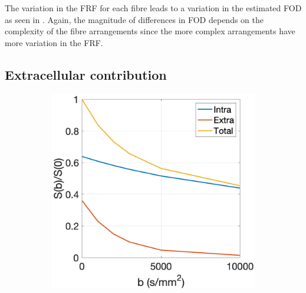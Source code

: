 The variation in the \ac{FRF} for each fibre leads to a variation in the estimated \ac{FOD} as seen in .
Again, the magnitude of differences in \ac{FOD} depends on the complexity of the fibre arrangements since the more complex arrangements have more variation in the \ac{FRF}. 

\subsection{Extracellular contribution}
\label{sec:frf_res_extracellular}


\begin{figure}
  \centering
  \begin{subfigure}[]{0.4\textwidth}
    \includegraphics[width=\textwidth]{figures/frf_experiment/in_ex_tot_Kappa_2.png}
    \caption{}
  \end{subfigure}
  ~
  \begin{subfigure}[]{0.4\textwidth}

\end{subfigure}
\end{figure}
